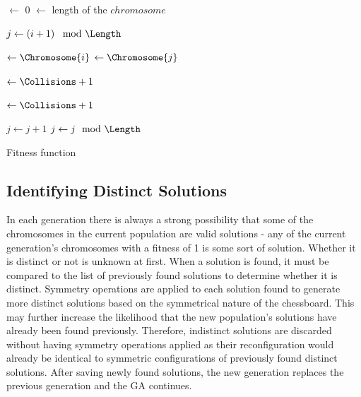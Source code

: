 \documentclass[conference]{IEEEtran}
\begin{document}
\begin{algorithm}[t!]
  \SetAlgoLined
  \DontPrintSemicolon
  
  {
    \BlankLine
    
    \Collisions $\leftarrow$ 0\;
    \Length $\leftarrow$ length of the $chromosome$\;
    \BlankLine
    
    {
      $j \leftarrow \left( i + 1 \right) \mod{\Length}$\;
      {
        \Yi $\leftarrow \Chromosome{i}$\;
        \Yj $\leftarrow \Chromosome{j}$\;
        \BlankLine
        
        \If{\Yi == \Yj}
        {
          \Collisions $\leftarrow \Collisions + 1$\; 
        }
        \BlankLine
        
        {
          \Collisions $\leftarrow \Collisions + 1$\;
        }
        \BlankLine
        
        $j \leftarrow j + 1$\;
        $j \leftarrow j \mod{\Length}$\;
      }
    }
    \BlankLine

    {
      \;
    }
    {
      \;
    }
  }
\caption{Fitness function}
\label{alg:fitness}
\end{algorithm}

\subsection{Identifying Distinct Solutions}
In each generation there is always a strong possibility that some of the chromosomes in the current population are valid solutions - any of the current generation's chromosomes with a fitness of 1 is some sort of solution. Whether it is distinct or not is unknown at first. When a solution is found, it must be compared to the list of previously found solutions to determine whether it is distinct. Symmetry operations are applied to each solution found to generate more distinct solutions based on the symmetrical nature of the chessboard. This may further increase the likelihood that the new population's solutions have already been found previously. Therefore, indistinct solutions are discarded without having symmetry operations applied as their reconfiguration would already be identical to symmetric configurations of previously found distinct solutions. After saving newly found solutions, the new generation replaces the previous generation and the GA continues.
\end{document}
